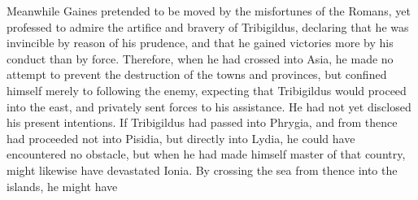 Meanwhile Gaines pretended to be moved by the misfortunes of the Romans, yet professed to admire the artifice and bravery of Tribigildus, declaring that he was invincible by reason of his prudence, and that he gained victories more by his conduct than by force. Therefore, when he had crossed into Asia, he made no attempt to prevent the destruction of the towns and provinces, but confined himself merely to following the enemy, expecting that Tribigildus would proceed into the east, and privately sent forces to his assistance. He had not yet disclosed his present intentions. If Tribigildus had passed into Phrygia, and from thence had proceeded not into Pisidia, but directly into Lydia, he could have encountered no obstacle, but when he had made himself master of that country, might likewise have devastated Ionia. By crossing the sea from thence into the islands, he might have
